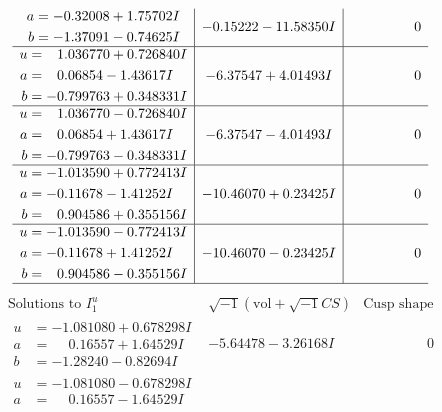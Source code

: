 \documentclass[1p]{elsarticle_modified}
\theoremstyle{definition}
\newcommand{\I}{\sqrt{-1}}
\begin{document}
$$\begin{array}{c|c|c}
\begin{aligned}
a &= -0.32008 + 1.75702 I \\
b &= -1.37091 - 0.74625 I\end{aligned}
 & -0.15222 - 11.58350 I & \phantom{-0.000000 } 0 \\ \hline\begin{aligned}
u &= \phantom{-}1.036770 + 0.726840 I \\
a &= \phantom{-}0.06854 - 1.43617 I \\
b &= -0.799763 + 0.348331 I\end{aligned}
 & -6.37547 + 4.01493 I & \phantom{-0.000000 } 0 \\ \hline\begin{aligned}
u &= \phantom{-}1.036770 - 0.726840 I \\
a &= \phantom{-}0.06854 + 1.43617 I \\
b &= -0.799763 - 0.348331 I\end{aligned}
 & -6.37547 - 4.01493 I & \phantom{-0.000000 } 0 \\ \hline\begin{aligned}
u &= -1.013590 + 0.772413 I \\
a &= -0.11678 - 1.41252 I \\
b &= \phantom{-}0.904586 + 0.355156 I\end{aligned}
 & -10.46070 + 0.23425 I & \phantom{-0.000000 } 0 \\ \hline\begin{aligned}
u &= -1.013590 - 0.772413 I \\
a &= -0.11678 + 1.41252 I \\
b &= \phantom{-}0.904586 - 0.355156 I\end{aligned}
 & -10.46070 - 0.23425 I & \phantom{-0.000000 } 0\\
 \hline 
 \end{array}$$\newpage$$\begin{array}{c|c|c}  
\text{Solutions to }I^u_{1}& \I (\text{vol} + \sqrt{-1}CS) & \text{Cusp shape}\\
 \hline 
\begin{aligned}
u &= -1.081080 + 0.678298 I \\
a &= \phantom{-}0.16557 + 1.64529 I \\
b &= -1.28240 - 0.82694 I\end{aligned}
 & -5.64478 - 3.26168 I & \phantom{-0.000000 } 0 \\ \hline\begin{aligned}
u &= -1.081080 - 0.678298 I \\
a &= \phantom{-}0.16557 - 1.64529 I \\

\end{aligned}
\end{array}$$
\end{document}
